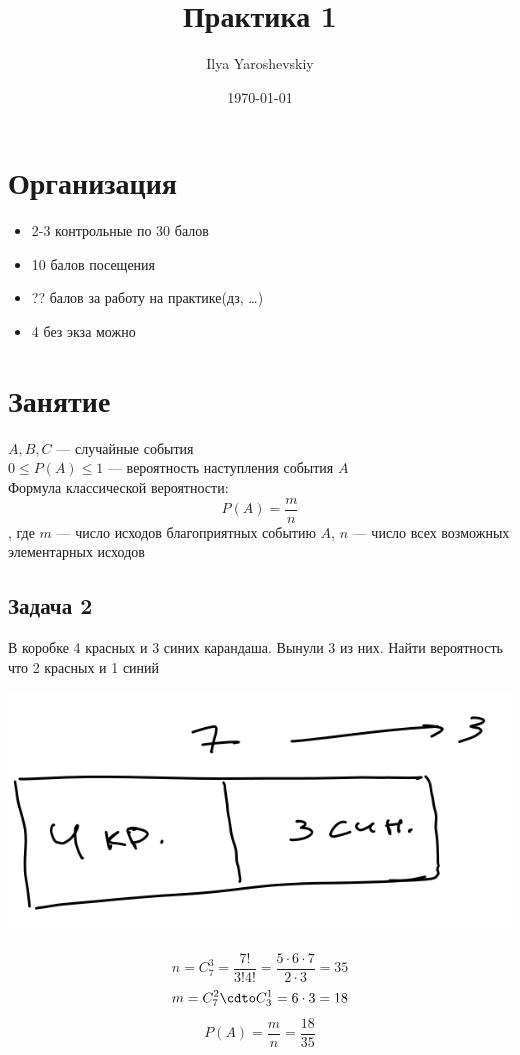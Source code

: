 \documentclass[english]{article}
\author{Ilya Yaroshevskiy}
\date{\today}
\title{Практика 1}
\theoremstyle{plain}
\theoremstyle{remark}
\theoremstyle{definition}
\begin{document}
\maketitle
\tableofcontents


\section{Организация}
\label{sec:org1039da2}
\begin{itemize}
\item 2-3 контрольные по 30 балов
\item 10 балов посещения
\item ?? балов за работу на практике(дз, \ldots{})
\item 4 без экза можно
\end{itemize}

\section{Занятие}
\label{sec:orgdec861d}
\(A, B, C\) --- случайные события \\
\(0 \le P(A) \le 1\) --- вероятность наступления события \(A\) \\
Формула классической вероятности:
\[ P(A) = \frac{m}{n} \]
, где \(m\) --- число исходов благоприятных событию \(A\), \(n\) --- число всех возможных элементарных исходов

\subsection{Задача 2}
\label{sec:org135c4a7}
В коробке 4 красных и 3 синих карандаша. Вынули 3 из них. Найти вероятность что 2 красных и 1 синий

\begin{center}
\includegraphics[width=.9\linewidth]{1_2.png}
\end{center}

\[ n = C^3_7 = \frac{7!}{3!4!} = \frac{5\cdot 6 \cdot 7}{2 \cdot 3} = 35 \]
\[ m = C^2_7 \cdto C^1_3 = 6\cdot 3 = 18 \]
\[ P(A) = \frac{m}{n} = \frac{18}{35} \]
\end{document}
